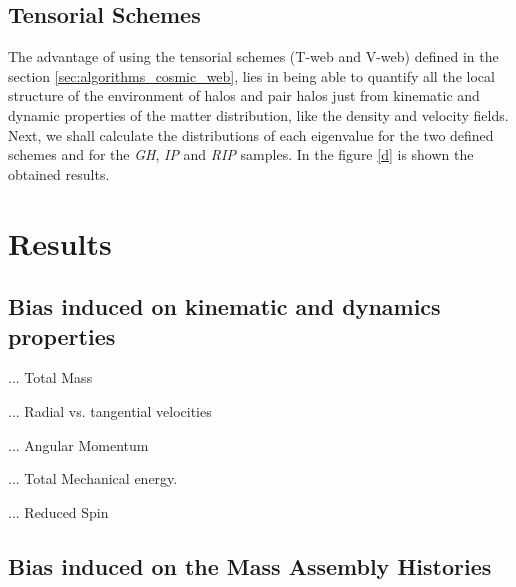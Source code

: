 \documentclass[usenatbib]{latex/mn2e}
\begin{document}
\subsection{Tensorial Schemes}
\label{subsec:tensorial schemes}



The advantage of using the tensorial schemes (T-web and V-web) defined in
the section \ref{sec:algorithms_cosmic_web}, lies in being able to quantify
all the local structure of the environment of halos and pair halos just 
from kinematic and dynamic properties of the matter distribution, like the
density and velocity fields. Next, we shall calculate the distributions of 
each eigenvalue for the two defined schemes and for the \textit{GH}, 
\textit{IP} and \textit{RIP} samples. In the figure \ref{d} is shown the 
obtained results.


\section{Results}
\label{sec:Results}

\subsection{Bias induced on kinematic and dynamics properties}
\label{subsec:bias_kinematic}

... Total Mass

... Radial vs. tangential velocities

... Angular Momentum

... Total Mechanical energy.

... Reduced Spin


\subsection{Bias induced on the Mass Assembly Histories}
\label{subsec:bias_MAH}
\end{document}
